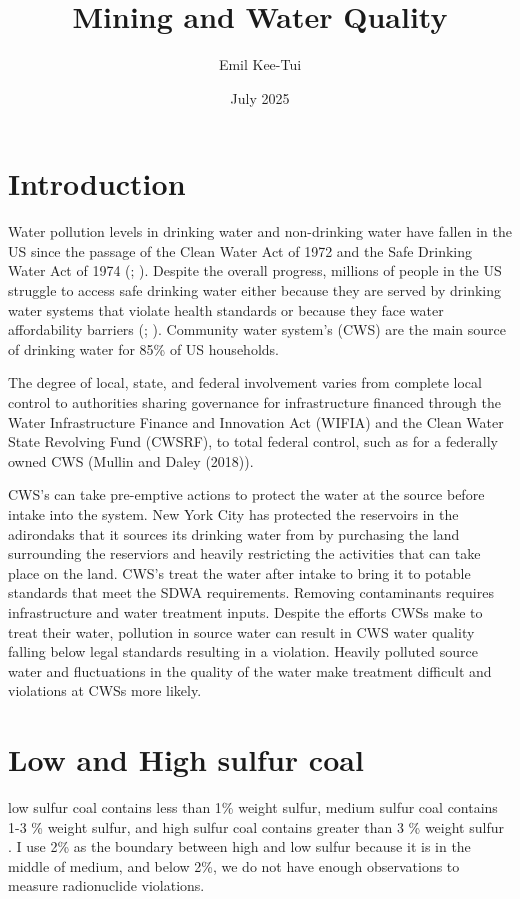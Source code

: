 \documentclass{article}
\title{Mining and Water Quality}
\author{Emil Kee-Tui}
\date{July 2025}
\begin{document}
\maketitle

\section{Introduction}

Water pollution levels in drinking water and non-drinking water have fallen in the US since the passage of the Clean Water Act of 1972 and the Safe Drinking Water Act of 1974 (\cite{keiser2019us}; \cite{keiser2023us}). Despite the overall progress, millions of people in the US struggle to access safe drinking water either because they are served by drinking water systems that violate health standards or because they face water affordability barriers (\cite{allaire2018national}; \cite{cardoso2022water}). Community water system's (CWS) are the main source of drinking water for 85\% of US households.

The degree of local, state, and federal involvement varies from complete local control to authorities sharing governance for infrastructure financed through the Water Infrastructure Finance and Innovation Act (WIFIA) and the Clean Water State Revolving Fund (CWSRF), to total federal control, such as for a federally owned CWS (Mullin and Daley (2018)). 


CWS's can take pre-emptive actions to protect the water at the source before intake into the system. New York City has protected the reservoirs in the adirondaks that it sources its drinking water from by purchasing the land surrounding the reserviors and heavily restricting the activities that can take place on the land. CWS's treat the water after intake to bring it to potable standards that meet the SDWA requirements. Removing contaminants requires infrastructure and water treatment inputs. Despite the efforts CWSs make to treat their water, pollution in source water can result in CWS water quality falling below legal standards resulting in a violation. Heavily polluted source water and fluctuations in the quality of the water make treatment difficult and violations at CWSs more likely. 

\section{Low and High sulfur coal}
low sulfur coal contains less than 1\% weight sulfur, medium sulfur coal contains 1-3 \% weight sulfur, and high sulfur coal contains greater than 3 \% weight sulfur \cite{schweinfurth2009introduction}. I use 2\% as the boundary between high and low sulfur because it is in the middle of medium, and below 2\%, we do not have enough observations to measure radionuclide violations.
\end{document}
